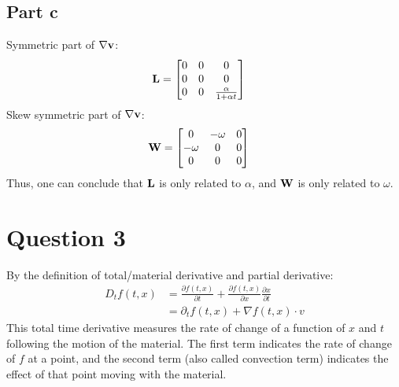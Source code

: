\documentclass[a4paper,12pt]{article} %
\begin{document}
\subsection{Part c}
Symmetric part of $\nabla \mathbf{v}$:
\begin{align*}
    \mathbf{L} &= \begin{bmatrix}
        0&0&0\\
        0&0&0\\
        0&0&\frac{\alpha}{1+\alpha t}\\
    \end{bmatrix}
\end{align*}
Skew symmetric part of $\nabla \mathbf{v}$:
\begin{align*}
    \mathbf{W} &= \begin{bmatrix}
        0&-\omega&0\\
        -\omega&0&0\\
        0&0&0\\
    \end{bmatrix}
\end{align*}
Thus, one can conclude that $\mathbf{L}$ is only related to $\alpha$, and $\mathbf{W}$ is only related to $\omega$. 



\newpage
\section{\textbf{Question 3}}
By the definition of total/material derivative and partial derivative:
\begin{align*}
D_t f(t,x) &= \frac{\partial f(t,x)}{\partial t} + \frac{\partial f(t,x)}{\partial x}\frac{\partial x}{\partial t}\\
&= {\partial}_t f(t,x) + \nabla f(t,x) \cdot v
\end{align*}
This total time derivative measures the rate of change of a function of $x$ and $t$ following the motion of the material.
The first term indicates the rate of change of $f$ at a point, and the second term (also called convection term) indicates
the effect of that point moving with the material.

\newpage
\end{document}
